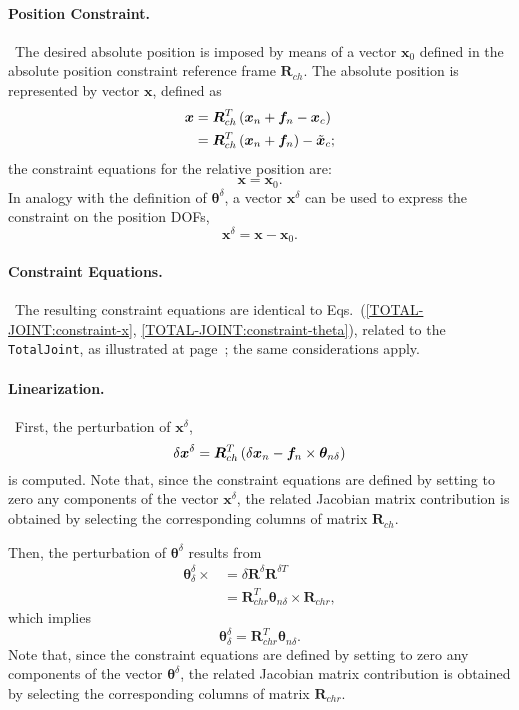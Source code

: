 \documentclass[10pt,dvips,fleqn,subeqn]{report}
\newcommand{\T}[1]{\bm{#1}}
\newcommand{\dofs}{DOFs}
\begin{document}
\paragraph{Position Constraint.} \
The desired absolute position is imposed by means of a vector $\T{x}_0$
defined in the absolute position constraint reference frame $\T{R}_{ch}$.
The absolute position is represented by vector $\T{x}$, defined as
\begin{align}
	\T{x} &= \T{R}_{ch}^T\plbr{
		\T{x}_n + \T{f}_n - \T{x}_c
	} \nonumber \\
	&= \T{R}_{ch}^T\plbr{
		\T{x}_n + \T{f}_n
	} - \tilde{\T{x}}_c ;
\end{align}
the constraint equations for the relative position are:
\begin{equation}
	\T{x} = \T{x}_0 .
\end{equation}
In analogy with the definition of $\T{\theta}^{\delta}$, a vector
$\T{x}^{\delta}$ can be used to express the constraint
on the position \dofs,
\begin{equation}
	\T{x}^{\delta} = \T{x} - \T{x}_0 .
\end{equation}

\paragraph{Constraint Equations.} \
The resulting constraint equations are identical
to Eqs.~(\ref{TOTAL-JOINT:constraint-x}, \ref{TOTAL-JOINT:constraint-theta}),
related to the \texttt{TotalJoint}, as illustrated
at page~\pageref{TOTAL-JOINT:constraint-x};
the same considerations apply.

\paragraph{Linearization.} \
First, the perturbation of $\T{x}^{\delta}$,
\begin{equation}
	\delta \T{x}^{\delta} = 
	\T{R}_{ch}^T\plbr{
		\delta\T{x}_n - \T{f}_n \times \T{\theta}_{n\delta}
	}
\end{equation}
is computed.
Note that, since the constraint equations are defined by setting 
to zero any components of the vector $\T{x}^{\delta}$, the
related Jacobian matrix contribution is obtained by selecting 
the corresponding columns of matrix $\T{R}_{ch}$.

Then, the perturbation of $\T{\theta}^{\delta}$ results from
\begin{align}
	\T{\theta}^{\delta}_{\delta} \times{}
	&= \delta\T{R}^{\delta} \T{R}^{\delta T} \nonumber \\
	&= \T{R}_{chr}^T \T{\theta}_{n\delta} \times \T{R}_{chr} ,
\end{align}
which implies
\begin{equation}
	\T{\theta}^{\delta}_{\delta} = \T{R}_{chr}^T \T{\theta}_{n\delta} .
\end{equation}
Note that, since the constraint equations are defined by setting 
to zero any components of the vector $\T{\theta}^{\delta}$, the
related Jacobian matrix contribution is obtained by selecting 
the corresponding columns of matrix $\T{R}_{chr}$.
\end{document}
